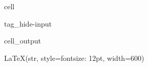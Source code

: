 \documentclass[letterpaper,10pt,english]{jupyterBook}
\begin{document}
\begin{sphinxuseclass}{cell}
\begin{sphinxuseclass}{tag_hide-input}\begin{sphinxVerbatimOutput}

\begin{sphinxuseclass}{cell_output}
\begin{sphinxVerbatim}[commandchars=\\\{\}]
LaTeX(str, style=\PYGZob{}\PYGZsq{}font\PYGZhy{}size\PYGZsq{}: \PYGZsq{}12pt\PYGZsq{}\PYGZcb{}, width=600)
\end{sphinxVerbatim}

\end{sphinxuseclass}\end{sphinxVerbatimOutput}

\end{sphinxuseclass}
\end{sphinxuseclass}
\end{document}
